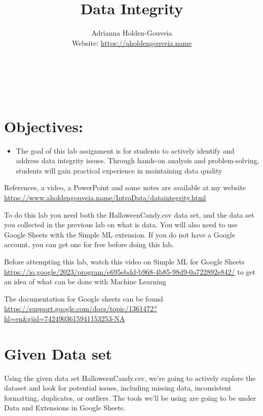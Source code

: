\documentclass[12pt]{article}
\title{Data Integrity}
\author{
        Adrianna Holden-Gouveia \\
        Website: \url{https://aholdengouveia.name}\\ 
        \date{\vspace{-5ex}}
        \faLinkedin{: aholdengouveia} \\
        \faGithub {: aholdengouveia} \\
        \faTwitter {: aholdengouveia} \\
        }
\begin{document}
    

\maketitle


\section*{Objectives:}
\begin{itemize}
    \item The goal of this lab assignment is for students to actively identify and address data integrity issues. Through hands-on analysis and problem-solving, students will gain practical experience in maintaining data quality
\end{itemize}

References, a video, a PowerPoint and some notes are available at my website
\url {https://www.aholdengouveia.name/IntroData/dataintegrity.html}


To do this lab you need both the HalloweenCandy.csv data set, and the data set you collected in the previous lab on what is data. You will also need to use Google Sheets with the Simple ML extension.  If you do not have a Google account, you can get one for free before doing this lab.  

Before attempting this lab, watch this video on Simple ML for Google Sheets \url{https://io.google/2023/program/e695ebdd-b968-4b85-98d9-0a722892e842/} to get an idea of what can be done with Machine Learning

The documentation for Google sheets can be found \url{https://support.google.com/docs/topic/1361472?hl=en&sjid=7424903615941153253-NA}


\section*{Given Data set}

Using the given data set HalloweenCandy.csv, we're going to actively explore the dataset and look for potential issues, including missing data, inconsistent formatting, duplicates, or outliers. The tools we'll be using are going to be under Data and Extensions in Google Sheets. 
\end{document}
